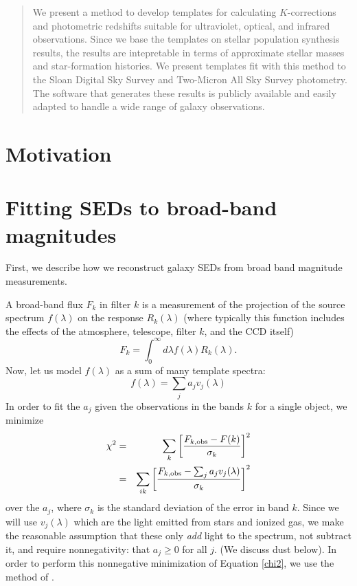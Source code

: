 \documentclass[10pt,preprint]{aastex}
\begin{document}
\clearpage

\begin{abstract}
We present a method to develop templates for calculating
$K$-corrections and photometric redshifts suitable for ultraviolet,
optical, and infrared observations. Since we base the templates on
stellar population synthesis results, the results are intepretable in
terms of approximate stellar masses and star-formation histories. We
present templates fit with this method to the Sloan Digital Sky Survey
and Two-Micron All Sky Survey photometry.  The software that generates
these results is publicly available and easily adapted to handle a
wide range of galaxy observations.
\end{abstract}


\section{Motivation}
\label{motivation}


\section{Fitting SEDs to broad-band magnitudes}
\label{sedfit}

First, we describe how we reconstruct galaxy SEDs from broad band
magnitude measurements. 

A broad-band flux $F_k$ in filter $k$ is a measurement of the
projection of the source spectrum $f(\lambda)$ on the response
$R_k(\lambda)$ (where typically this function includes the effects of
the atmosphere, telescope, filter $k$, and the CCD itself)
\begin{equation}
F_k = \int_0^\infty d\lambda f(\lambda) R_k(\lambda).
\end{equation}
Now, let us model $f(\lambda)$ as a sum of many template spectra:
\begin{equation}
f(\lambda) = \sum_j a_j v_j(\lambda)
\end{equation}
In order to fit the $a_j$ given the observations in the bands $k$ for
a single object, we minimize
\begin{eqnarray}
\label{chi2}
\chi^2 &=& \sum_{k} \left[ \frac{F_{k,\mathrm{obs}} - F(k)}{\sigma_k}
\right]^2 \cr
&=& \sum_{ik} \left[ \frac{F_{k,\mathrm{obs}} -\sum_j a_j
  v_j(\lambda)}{\sigma_k} \right]^2
\end{eqnarray}
over the $a_j$, where $\sigma_k$ is the standard deviation of the
error in band $k$. Since we will use $v_j(\lambda)$ which are the light
emitted from stars and ionized gas, we make the reasonable assumption
that these only {\it add} light to the spectrum, not subtract it, and
require nonnegativity: that $a_j\ge 0$ for all $j$. (We discuss dust
below).  In order to perform this nonnegative minimization of Equation
\ref{chi2}, we use the method of \citet{sha02a}. 
\end{document}
